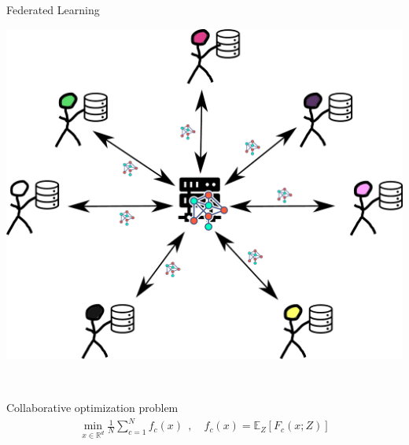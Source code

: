 \documentclass[aspectratio=169,12pt]{beamer}
\begin{document}


\begin{frame}[t]{Federated Learning}
\vspace{0.5em}
  \begin{minipage}{0.35\linewidth}
    \begin{center}
    \includegraphics[width=\linewidth]{images/federated_learning.pdf} 
    \end{center}
    
  \end{minipage}~~~~~~%
  \begin{minipage}{0.5\linewidth}

    \begin{center}
      Collaborative optimization problem
      \begin{align*}
        \min_{x \in \mathbb{R}^d} 
        \frac{1}{N} \sum_{c=1}^N f_c(x)
        ~~,
        \quad 
        f_c(x)
        = \mathbb{E}_Z[ F_c(x; Z) ]
      \end{align*}
    \end{center}
      
  \end{minipage}


\end{frame}
\end{document}
